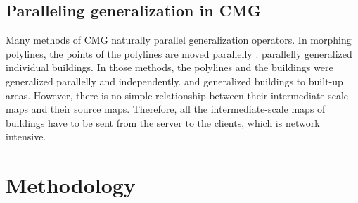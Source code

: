 \documentclass{ica}
\begin{document}
\subsection{Paralleling generalization in CMG}


Many methods of CMG naturally parallel generalization operators.
In morphing polylines, the points of the polylines are moved parallelly
\citep[\eg][]{Noellenburg2008,Li2017Annealing}.
\citet{Li2017_Building} parallelly generalized individual buildings.
In those methods, the polylines and the buildings 
were generalized parallelly and independently.
\citet{Peng2017Building} and \citet{Touya2017Progressive}
generalized buildings to built-up areas.
However, there is no simple relationship 
between their intermediate-scale maps and their source maps.
Therefore, all the intermediate-scale maps of buildings have to be
sent from the server to the clients,
which is network intensive.










%


\section{Methodology}
\label{sec:methodology}


\end{document}
